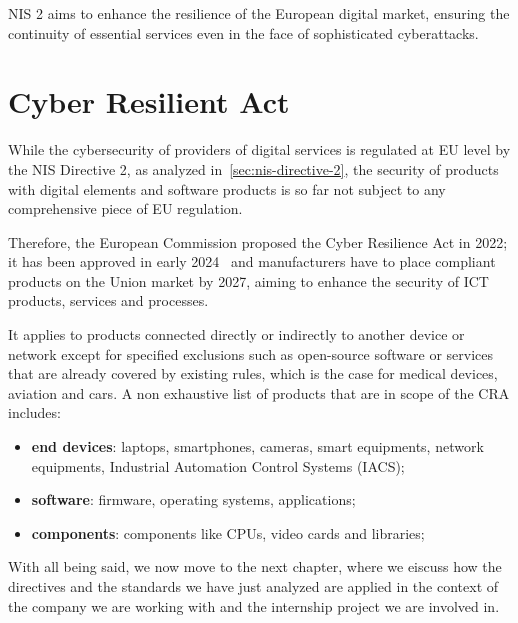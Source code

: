 NIS 2 aims to enhance the resilience of the European digital market, ensuring the continuity of essential services even in the face of sophisticated cyberattacks.

\section{Cyber Resilient Act}

While the cybersecurity of providers of digital services is regulated at EU level by the NIS Directive 2, as analyzed in~\cref{sec:nis-directive-2}, the security of products with digital elements and software products is so far not subject to any comprehensive piece of EU regulation.~\cite{cra-eu}

Therefore, the European Commission proposed the Cyber Resilience Act in 2022; it has been approved in early 2024~\cite{cra-timelinel} and manufacturers have to place compliant products on the Union market by 2027, aiming to enhance the security of ICT products, services and processes.

It applies to products connected directly or indirectly to another device or network except for specified exclusions such as open-source software or services that are already covered by existing rules, which is the case for medical devices, aviation and cars. A non exhaustive list of products that are in scope of the CRA includes:~\cite{cra-overview}
\begin{itemize}
  \item \textbf{end devices}: laptops, smartphones, cameras, smart equipments, network equipments, Industrial Automation Control Systems (IACS);
  \item \textbf{software}: firmware, operating systems, applications;
  \item \textbf{components}: components like CPUs, video cards and libraries;
\end{itemize}

With all being said, we now move to the next chapter, where we eiscuss how the directives and the standards we have just analyzed are applied in the context of the company we are working with and the internship project we are involved in.
